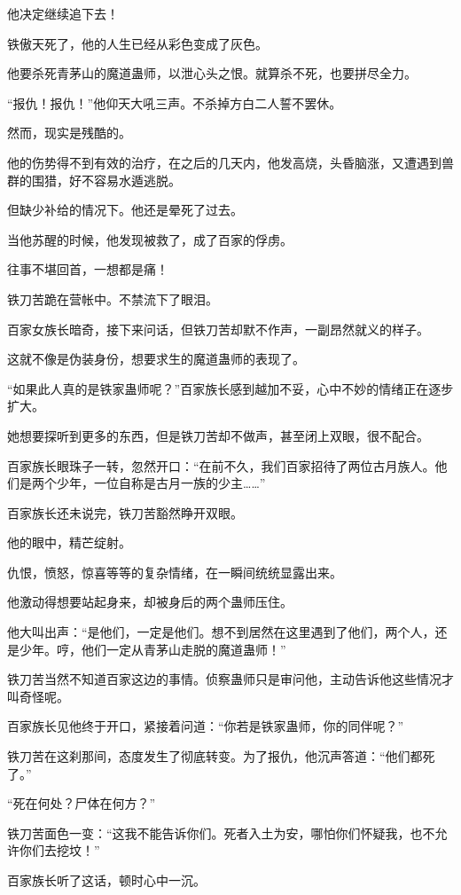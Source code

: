 \begin{this_body}
他决定继续追下去！

铁傲天死了，他的人生已经从彩色变成了灰色。

他要杀死青茅山的魔道蛊师，以泄心头之恨。就算杀不死，也要拼尽全力。

“报仇！报仇！”他仰天大吼三声。不杀掉方白二人誓不罢休。

然而，现实是残酷的。

他的伤势得不到有效的治疗，在之后的几天内，他发高烧，头昏脑涨，又遭遇到兽群的围猎，好不容易水遁逃脱。

但缺少补给的情况下。他还是晕死了过去。

当他苏醒的时候，他发现被救了，成了百家的俘虏。

往事不堪回首，一想都是痛！

铁刀苦跪在营帐中。不禁流下了眼泪。

百家女族长暗奇，接下来问话，但铁刀苦却默不作声，一副昂然就义的样子。

这就不像是伪装身份，想要求生的魔道蛊师的表现了。

“如果此人真的是铁家蛊师呢？”百家族长感到越加不妥，心中不妙的情绪正在逐步扩大。

她想要探听到更多的东西，但是铁刀苦却不做声，甚至闭上双眼，很不配合。

百家族长眼珠子一转，忽然开口：“在前不久，我们百家招待了两位古月族人。他们是两个少年，一位自称是古月一族的少主……”

百家族长还未说完，铁刀苦豁然睁开双眼。

他的眼中，精芒绽射。

仇恨，愤怒，惊喜等等的复杂情绪，在一瞬间统统显露出来。

他激动得想要站起身来，却被身后的两个蛊师压住。

他大叫出声：“是他们，一定是他们。想不到居然在这里遇到了他们，两个人，还是少年。哼，他们一定从青茅山走脱的魔道蛊师！”

铁刀苦当然不知道百家这边的事情。侦察蛊师只是审问他，主动告诉他这些情况才叫奇怪呢。

百家族长见他终于开口，紧接着问道：“你若是铁家蛊师，你的同伴呢？”

铁刀苦在这刹那间，态度发生了彻底转变。为了报仇，他沉声答道：“他们都死了。”

“死在何处？尸体在何方？”

铁刀苦面色一变：“这我不能告诉你们。死者入土为安，哪怕你们怀疑我，也不允许你们去挖坟！”

百家族长听了这话，顿时心中一沉。


\end{this_body}
